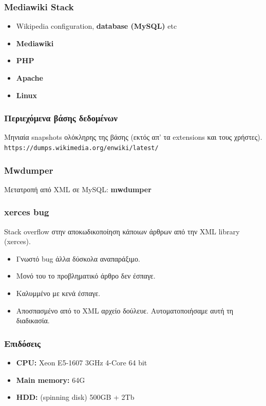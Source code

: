 \documentclass[bigger]{beamer}
\begin{document}
\begin{frame}
  \frametitle{Mediawiki Stack}

  \begin{itemize}
  \item Wikipedia configuration, \textbf<2>{database (MySQL)} etc
  \item \textbf<2>{Mediawiki}
  \item \textbf<2>{PHP}
  \item \textbf<2>{Apache}
  \item \textbf<2>{Linux}
  \end{itemize}
  \vfill
  \vfill
\end{frame}

\begin{frame}
  \frametitle{Περιεχόμενα βάσης δεδομένων}

  Μηνιαία snapshots ολόκληρης της βάσης (εκτός απ' τα extensions και
  τους χρήστες).
  \vfill
  \texttt{https://dumps.wikimedia.org/enwiki/latest/} \vfill
\end{frame}

\begin{frame}
  \frametitle{Mwdumper}

  Μετατροπή από XML σε MySQL: \bf{mwdumper}
\end{frame}

\begin{frame}
  \frametitle{xerces bug} Stack overflow στην αποκωδικοποίηση κάποιων
  άρθρων από την XML library (xerces).
  \vfill
  \begin{itemize}
  \item<2-> Γνωστό bug άλλα δύσκολα αναπαράξιμο.
  \item<3-> Μονό του το προβληματικό άρθρο δεν έσπαγε.
  \item<4-> Καλυμμένο με κενά έσπαγε.
  \item<5-> Αποσπασμένο από το XML αρχείο δούλευε. 
    Αυτοματοποιήσαμε αυτή τη διαδικασία.
  \end{itemize}
\end{frame}


\begin{frame}
  \frametitle{Επιδόσεις}
  \begin{itemize}
  \item \textbf{CPU:} Xeon E5-1607 3GHz 4-Core 64 bit
  \item \textbf{Main memory:} 64G
  \item \textbf{HDD:} (spinning disk) 500GB + 2Tb
  \end{itemize}
\end{frame}
\end{document}
